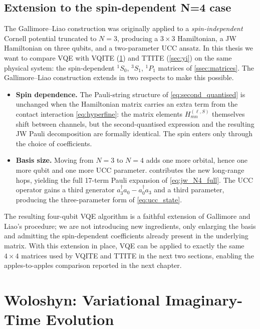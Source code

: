 \subsection{Extension to the spin-dependent N=4 case}
\label{ssec:gallimore_extension}

The Gallimore--Liao construction was originally applied to a
\emph{spin-independent} Cornell potential truncated to $N=3$, producing a
$3\times 3$ Hamiltonian, a JW Hamiltonian on three qubits, and a
two-parameter UCC ansatz. In this thesis we want to compare VQE with
VQITE (\cref{sec:woloshyn}) and TTITE (\cref{sec:yi}) on the same physical
system: the spin-dependent ${}^1S_0$, ${}^3S_1$, ${}^1P_1$ matrices of
\cref{ssec:matrices}. The Gallimore--Liao construction extends in two
respects to make this possible.

\begin{itemize}\setlength{\itemsep}{3pt}
  \item \textbf{Spin dependence.} The Pauli-string structure of
    \cref{eq:second_quantised} is unchanged when the Hamiltonian matrix
    carries an extra term from the contact interaction
    \cref{eq:hyperfine}: the matrix elements
    $H_{mn}^{(\ell,S)}$ themselves shift between channels, but the
    second-quantised expression and the resulting JW Pauli decomposition
    are formally identical. The spin enters only through the choice of
    coefficients.
  \item \textbf{Basis size.} Moving from $N=3$ to $N=4$ adds one more
    orbital, hence one more qubit and one more UCC parameter.
     contributes the new long-range hops, yielding the
    full 17-term Pauli expansion of \cref{eq:jw_N4_full}. The UCC operator
    gains a third generator $a_3^{\dagger}a_0 - a_0^{\dagger}a_3$ and a
    third parameter, producing the three-parameter form of
    \cref{eq:ucc_state}.
\end{itemize}

The resulting four-qubit VQE algorithm is a faithful extension of
Gallimore and Liao's procedure; we are not introducing new ingredients,
only enlarging the basis and admitting the spin-dependent coefficients
already present in the underlying matrix. With this extension in place,
VQE can be applied to exactly the same $4\times 4$ matrices used by VQITE
and TTITE in the next two sections, enabling the apples-to-apples
comparison reported in the next chapter.


\section{Woloshyn: Variational Imaginary-Time Evolution}
\label{sec:woloshyn}

